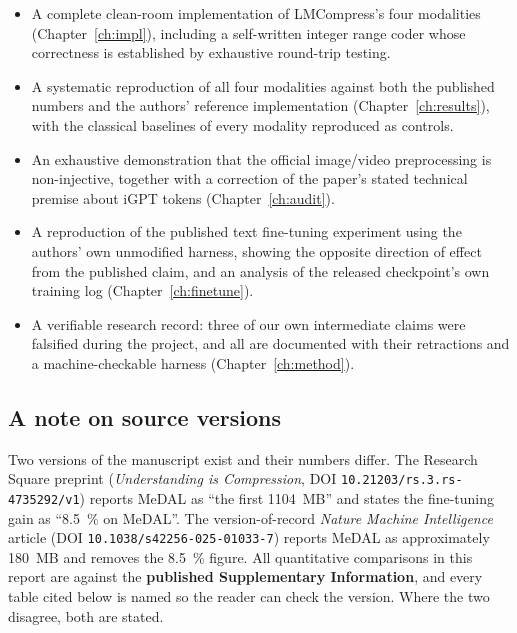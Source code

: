 \documentclass[11pt,a4paper]{article}
\begin{document}
\begin{itemize}[leftmargin=1.4em,itemsep=2pt]
\item A complete clean-room implementation of LMCompress's four modalities
      (Chapter~\ref{ch:impl}), including a self-written integer range coder whose
      correctness is established by exhaustive round-trip testing.
\item A systematic reproduction of all four modalities against both the published
      numbers and the authors' reference implementation
      (Chapter~\ref{ch:results}), with the classical baselines of every modality
      reproduced as controls.
\item An exhaustive demonstration that the official image/video preprocessing is
      non-injective, together with a correction of the paper's stated technical
      premise about iGPT tokens (Chapter~\ref{ch:audit}).
\item A reproduction of the published text fine-tuning experiment using the
      authors' own unmodified harness, showing the opposite direction of effect
      from the published claim, and an analysis of the released checkpoint's own
      training log (Chapter~\ref{ch:finetune}).
\item A verifiable research record: three of our own intermediate claims were
      falsified during the project, and all are documented with their retractions
      and a machine-checkable harness (Chapter~\ref{ch:method}).
\end{itemize}

\subsection{A note on source versions}

Two versions of the manuscript exist and their numbers differ. The Research
Square preprint (\emph{Understanding is Compression}, DOI
\texttt{10.21203/rs.3.rs-4735292/v1}) reports MeDAL as ``the first \SI{1104}{MB}''
and states the fine-tuning gain as ``\SI{8.5}{\%} on MeDAL''. The
version-of-record \emph{Nature Machine Intelligence} article
(DOI \texttt{10.1038/s42256-025-01033-7}) reports MeDAL as approximately
\SI{180}{MB} and removes the \SI{8.5}{\%} figure. All quantitative
comparisons in this report are against the \textbf{published Supplementary
Information}, and every table cited below is named so the reader can check the
version. Where the two disagree, both are stated.

\end{document}
